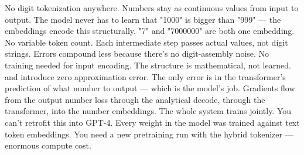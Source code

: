 {}
\markdownRendererSectionEnd 
\markdownRendererSectionEnd \markdownRendererSectionBegin
{}\markdownRendererInterblockSeparator
{}\markdownRendererSectionBegin
{}\markdownRendererInterblockSeparator
{}\markdownRendererOlBeginTight
{} No digit tokenization anywhere. Numbers stay as continuous values from input to output.\markdownRendererOlItemEnd 
{} The model never has to learn that "1000" is bigger than "999" — the embeddings encode this structurally.\markdownRendererOlItemEnd 
{} "7" and "7000000" are both one embedding. No variable token count.\markdownRendererOlItemEnd 
{} Each intermediate step passes actual values, not digit strings. Errors compound less because there's no digit-assembly noise.\markdownRendererOlItemEnd 
{} No training needed for input encoding. The structure is mathematical, not learned.\markdownRendererOlItemEnd 
{}  and  introduce zero approximation error. The only error is in the transformer's prediction of what number to output — which is the model's job.\markdownRendererOlItemEnd 
{} Gradients flow from the output number loss through the analytical decode, through the transformer, into the number embeddings. The whole system trains jointly.\markdownRendererOlItemEnd 
\markdownRendererOlEndTight \markdownRendererInterblockSeparator
{}
\markdownRendererSectionEnd \markdownRendererSectionBegin
{}\markdownRendererInterblockSeparator
{}\markdownRendererOlBeginTight
{} You can't retrofit this into GPT-4. Every weight in the model was trained against text token embeddings. You need a new pretraining run with the hybrid tokenizer — enormous compute cost.\markdownRendererOlItemEnd 
